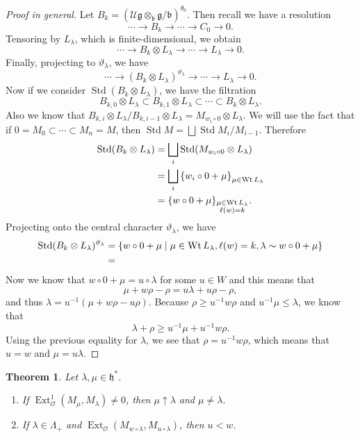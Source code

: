 \documentclass[leqno, openany]{memoir}
\newtheorem{thm}{Theorem}[section]
\theoremstyle{definition}
\theoremstyle{remark}
\theoremstyle{plain}
\theoremstyle{definition}
\theoremstyle{remark}
\newcommand{\U}{\mathcal{U}}
\newcommand{\cO}{\mathcal{O}}
\newcommand{\g}{\mathfrak{g}}
\newcommand{\h}{\mathfrak{h}}
\newcommand{\mf}[1]{\mathfrak{#1}}
\newcommand{\on}[1]{\operatorname{#1}}
\DeclareMathOperator{\Ext}{Ext}
\begin{document}
\begin{proof}[Proof in general]
    Let $B_k = (\U \g \otimes_{\mf{b}} \g / \mf{b})^{\theta_0}$. Then recall we have a resolution
    \[ \cdots \to B_k \to \cdots \to C_0 \to 0. \]
    Tensoring by $L_{\lambda}$, which is finite-dimensional, we obtain
    \[ \cdots \to B_k \otimes L_{\lambda} \to \cdots \to L_{\lambda} \to 0. \]
    Finally, projecting to $\vartheta_{\lambda}$, we have
    \[ \cdots \to (B_k \otimes L_{\lambda})^{\vartheta_{\lambda}} \to \cdots \to L_{\lambda} \to 0. \]
    Now if we consider $\on{Std}(B_k \otimes L_{\lambda})$, we have the filtration
    \[ B_{k,0} \otimes L_{\lambda} \subset B_{k, 1} \otimes L_{\lambda} \subset \cdots \subset B_{k} \otimes L_{\lambda}. \]
    Also we know that $B_{k, i} \otimes L_{\lambda} / B_{k, i-1} \otimes L_{\lambda} = M_{w_i \circ 0} \otimes L_{\lambda}$. We will use the fact that if $0 = M_0 \subset \cdots \subset M_n = M$, then $\on{Std} M = \bigsqcup \on{Std} M_i / M_{i-1}$. Therefore
    \begin{align*}
        \on{Std}(B_k \otimes L_{\lambda}) &= \bigsqcup_i \on{Std}(M_{w_i \circ 0} \otimes L_{\lambda}) \\
        &= \bigsqcup_i \qty{w_i \circ 0 + \mu}_{\mu \in \on{Wt} L_{\lambda}} \\
        &= \qty{w \circ 0 + \mu}_{\substack{\mu \in \on{Wt} L_{\lambda} \\ \ell(w) = k}}.
    \end{align*}
    Projecting onto the central character $\vartheta_{\lambda}$, we have
    \begin{align*}
        \on{Std}(B_k \otimes L_{\lambda})^{\vartheta_{\lambda}} &= \qty{w \circ 0 + \mu \mid \mu \in \on{Wt} L_{\lambda}, \ell(w) = k, \lambda \sim w \circ 0 + \mu} \\
        &= 
    \end{align*}
    Now we know that $w \circ 0 + \mu = u \circ \lambda$ for some $u \in W$ and this means that
    \[ \mu + w \rho - \rho = u \lambda + u \rho - \rho, \]
    and thus $\lambda = u^{-1}(\mu + w \rho - u \rho)$. Because $\rho \geq u^{-1} w \rho$ and $u^{-1} \mu \leq \lambda$, we know that
    \[ \lambda + \rho \geq u^{-1} \mu + u^{-1} w \rho. \]
    Using the previous equality for $\lambda$, we see that $\rho = u^{-1} w \rho$, which means that $u = w$ and $\mu = u \lambda$.
\end{proof}

\begin{thm}
    Let $\lambda, \mu \in \h^*$.
    \begin{enumerate}
        \item If $\Ext_{\cO}^1(M_{\mu}, M_{\lambda}) \neq 0$, then $\mu \uparrow \lambda$ and $\mu \neq \lambda$.
        \item If $\lambda \in \Lambda_+$ and $\Ext_{\cO}(M_{w \circ \lambda}, M_{u \circ \lambda})$, then $u < w$.
    \end{enumerate}
\end{thm}
\end{document}
